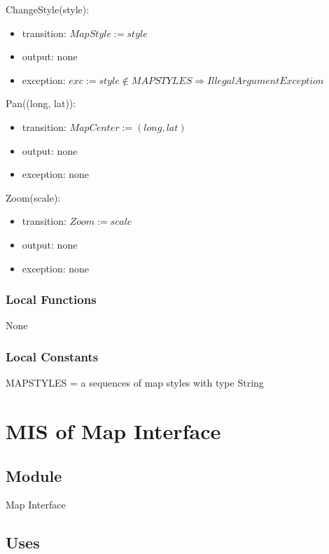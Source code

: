 \documentclass[12pt, titlepage]{article}
\begin{document}
\noindent ChangeStyle(style):
\begin{itemize}
\item transition: $MapStyle := style$
\item output: none
\item exception: $exc := style \notin MAPSTYLES \Rightarrow IllegalArgument Exception$
\end{itemize}

\noindent Pan((long, lat)):
\begin{itemize}
\item transition: $MapCenter := (long, lat)$
\item output: none
\item exception: none
\end{itemize}

\noindent Zoom(scale):
\begin{itemize}
\item transition: $Zoom := scale$
\item output: none
\item exception: none
\end{itemize}

\subsubsection{Local Functions}

None

\subsubsection{Local Constants}

MAPSTYLES = a sequences of map styles with type String
 
\newpage

\section{MIS of Map Interface} \label{mMapInterface}

\subsection{Module}

Map Interface

\subsection{Uses}
\end{document}
